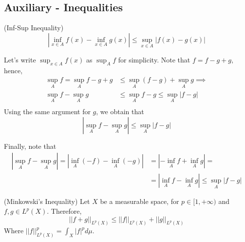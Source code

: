 \subsection{Auxiliary - Inequalities}

\begin{lemma}(Inf-Sup Inequality)
	\begin{equation}
		|\inf_{x \in A} f(x) - \inf_{x \in A} g(x)| \leq
		\sup_{x \in A}|f(x)- g(x)|
	\end{equation}
	\label{lem:infsup_ineq}
\end{lemma}
\begin{prf}
	Let's write $\sup_{x \in A}f(x)$ as $\sup_A f$ for simplicity.
	Note that $f = f - g + g$, hence,
	\begin{align*}
		\sup_A f = \sup_A f - g + g & \leq
		\sup_A (f-g) + \sup_A g \implies   \\
		\sup_A f - \sup_A g         & \leq
		\sup_A f-g \leq \sup_A |f-g|       \\
	\end{align*}
	Using the same argument for $g$, we obtain that
	\begin{equation}
		|\sup_A f - \sup_A g| \leq \sup_A |f-g|
	\end{equation}

	Finally, note that
	\begin{align*}
		|\sup_A f - \sup_A g| =
		|\inf_A (-f) - \inf_A (-g)| & =
		|-\inf_A f + \inf_A g| =                                                \\
		                            & =|\inf_A f - \inf_A g | \leq \sup_A |f-g|
	\end{align*}
\end{prf}

\begin{lemma} (Minkowski's Inequality)
	Let $X$ be a measurable space, for $p \in [1,+\infty)$ and $f,g \in L^p(X)$. Therefore,
	\begin{equation}
		||f + g||_{L^p(X)} \leq
		||f||_{L^p(X)} + 
		||g||_{L^p(X)}
	\end{equation}
	Where $||f||_{L^p(X)}^p = \int_X |f|^p d\mu$.
	\label{lem:minkowski}
\end{lemma}